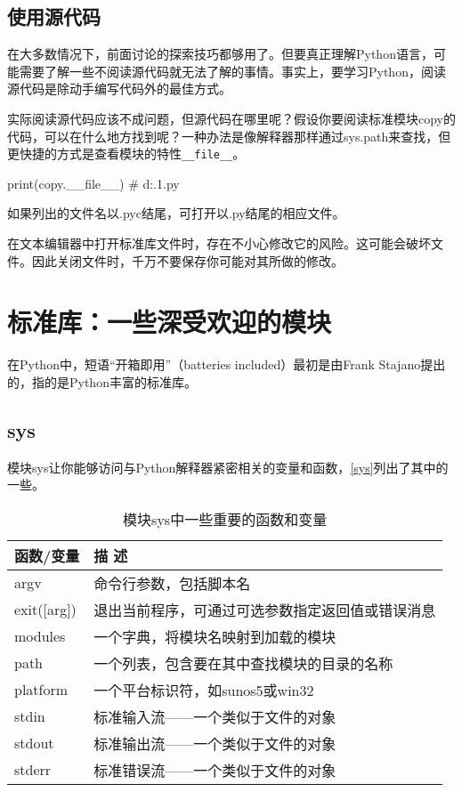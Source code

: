 \subsection{使用源代码}
在大多数情况下，前面讨论的探索技巧都够用了。但要真正理解Python语言，可能需要了解一些不阅读源代码就无法了解的事情。事实上，要学习Python，阅读源代码是除动手编写代码外的最佳方式。

实际阅读源代码应该不成问题，但源代码在哪里呢？假设你要阅读标准模块copy的代码，可以在什么地方找到呢？一种办法是像解释器那样通过sys.path来查找，但更快捷的方式是查看模块的特性\verb|__file__|。

\begin{pyc}
print(copy.__file__)
# d:.1\Lib\copy.py
\end{pyc}
如果列出的文件名以.pyc结尾，可打开以.py结尾的相应文件。

\begin{tcolorbox}
在文本编辑器中打开标准库文件时，存在不小心修改它的风险。这可能会破坏文件。因此关闭文件时，千万不要保存你可能对其所做的修改。
\end{tcolorbox}

\section{标准库：一些深受欢迎的模块}
在Python中，短语“开箱即用”（batteries included）最初是由Frank Stajano提出的，指的是Python丰富的标准库。
\subsection{sys}
模块sys让你能够访问与Python解释器紧密相关的变量和函数，\autoref{sys}列出了其中的一些。
\begin{table}
    \centering
    \caption{模块sys中一些重要的函数和变量}
    \label{sys}
    \begin{tabular}{ll}
        \hline
        函数/变量       & 描 述                      \\
        \hline
        argv        & 命令行参数，包括脚本名              \\
        exit([arg]) & 退出当前程序，可通过可选参数指定返回值或错误消息 \\
        modules     & 一个字典，将模块名映射到加载的模块        \\
        path        & 一个列表，包含要在其中查找模块的目录的名称    \\
        platform    & 一个平台标识符，如sunos5或win32    \\
        stdin       & 标准输入流——一个类似于文件的对象        \\
        stdout      & 标准输出流——一个类似于文件的对象        \\
        stderr      & 标准错误流——一个类似于文件的对象        \\
        \hline
    \end{tabular}
\end{table}

